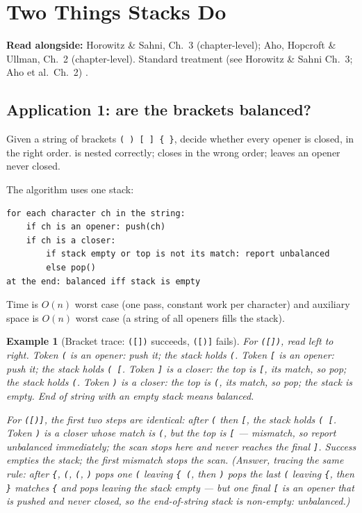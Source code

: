 \documentclass[11pt]{article}
\newtheorem{example}{Example}[section]
\begin{document}
\section{Two Things Stacks Do}

\textbf{Read alongside:} Horowitz \& Sahni, Ch.~3 (chapter-level); Aho, Hopcroft \& Ullman, Ch.~2 (chapter-level). Standard treatment (see Horowitz \& Sahni Ch.~3; Aho et al.\ Ch.~2) \cite{HorowitzSahni2008_fundamentals_data_structures,AhoHopcroftUllman1983_data_structures_algorithms}.

\subsection{Application 1: are the brackets balanced?}

Given a string of brackets \texttt{( ) [ ] \{ \}}, decide whether every opener is closed, in the right order. \good{\texttt{([])}} is nested correctly; \bad{\texttt{([)]}} closes in the wrong order; \bad{\texttt{((()}} leaves an opener never closed. 

The algorithm uses one stack:
{\footnotesize
\begin{verbatim}
for each character ch in the string:
    if ch is an opener: push(ch)
    if ch is a closer:
        if stack empty or top is not its match: report unbalanced
        else pop()
at the end: balanced iff stack is empty
\end{verbatim}
}
Time is $O(n)$ worst case (one pass, constant work per character) and auxiliary space is $O(n)$ worst case (a string of all openers fills the stack).

\begin{example}[Bracket trace: \texttt{([])} succeeds, \texttt{([)]} fails]
For \texttt{([])}, read left to right. Token \texttt{(} is an opener: push it; the stack holds \texttt{(}. Token \texttt{[} is an opener: push it; the stack holds \texttt{( [}. Token \texttt{]} is a closer: the top is \texttt{[}, its match, so pop; the stack holds \texttt{(}. Token \texttt{)} is a closer: the top is \texttt{(}, its match, so pop; the stack is empty. End of string with an empty stack means balanced.

For \texttt{([)]}, the first two steps are identical: after \texttt{(} then \texttt{[}, the stack holds \texttt{( [}. Token \texttt{)} is a closer whose match is \texttt{(}, but the top is \texttt{[} --- mismatch, so report unbalanced immediately; the scan stops here and never reaches the final \texttt{]}. Success empties the stack; the first mismatch stops the scan. \muted{Try it on \texttt{\{(()\}[} before the lab --- where does it fail?} (Answer, tracing the same rule: after \texttt{\{}, \texttt{(}, \texttt{(}, \texttt{)} pops one \texttt{(} leaving \texttt{\{ (}, then \texttt{)} pops the last \texttt{(} leaving \texttt{\{}, then \texttt{\}} matches \texttt{\{} and pops leaving the stack empty --- but one final \texttt{[} is an opener that is pushed and never closed, so the end-of-string stack is non-empty: unbalanced.)
\end{example}
\end{document}
